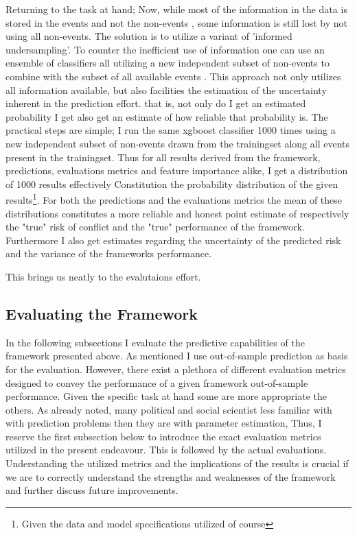 \documentclass[a4paper]{article}
\begin{document}
Returning to the task at hand; Now, while most of the information in the data is stored in the events and not the non-events \cite[139]{King_Zeng_2001}, some information is still lost by not using all non-events. The solution is to utilize a variant of 'informed undersampling'. To counter the inefficient use of information one can use an ensemble of classifiers all utilizing a new independent subset of non-events to combine with the subset of all available events \cite[1267]{He_2008}. This approach not only utilizes all information available, but also facilities the estimation of the uncertainty inherent in the prediction effort. that is, not only do I get an estimated probability I get also get an estimate of how reliable that probability is. The practical steps are simple; I run the same xgboost classifier 1000 times using a new independent subset of non-events drawn from the trainingset along all events present in the trainingset. Thus for all results derived from the framework, predictions, evaluations metrics and feature importance alike, I get a distribution of 1000 results effectively Constitution the probability distribution of the given results\footnote{Given the data and model specifications utilized of course}. For both the predictions and the evaluations metrics the mean of these distributions constitutes a more reliable and honest point estimate of respectively the "true" risk of conflict and the "true" performance of the framework. Furthermore I also get estimates regarding the uncertainty of the predicted risk and the variance of the frameworks performance.\par

This brings us neatly to the evalutaions effort.\par

\subsection{Evaluating the Framework}
In the following subsections I evaluate the predictive capabilities of the framework presented above. As mentioned I use out-of-sample prediction as basis for the evaluation. However, there exist a plethora of different evaluation metrics designed to convey the performance of a given framework out-of-sample performance. Given the specific task at hand some are more appropriate the others. As already noted, many political and social scientist less familiar with with prediction problems then they are with parameter estimation, Thus, I reserve the first subsection below to introduce the exact evaluation metrics utilized in the present endeavour. This is followed by the actual evaluations. Understanding the utilized metrics and the implications of the results is crucial if we are to correctly understand the strengths and weaknesses of the framework and further discuss future improvements.\par
\end{document}
